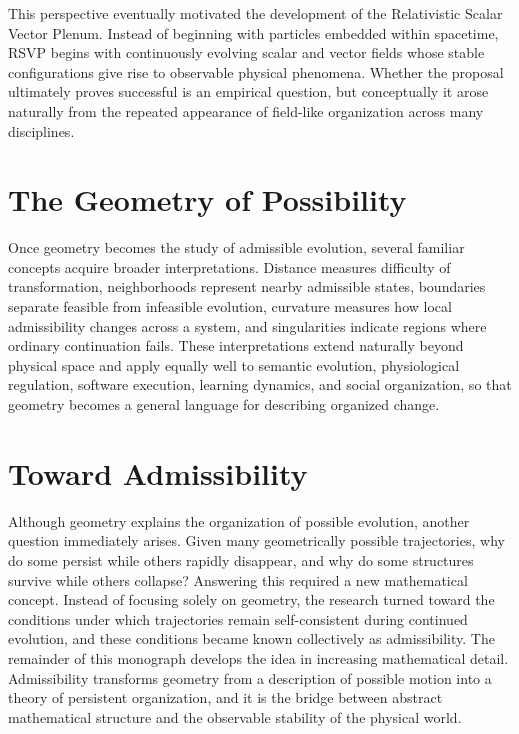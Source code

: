 \documentclass[11pt,oneside]{book}
\numberwithin{equation}{chapter}
\theoremstyle{definition}
\theoremstyle{plain}
\begin{document}
This perspective eventually motivated the development of the Relativistic Scalar Vector Plenum. Instead of beginning with particles embedded within spacetime, RSVP begins with continuously evolving scalar and vector fields whose stable configurations give rise to observable physical phenomena. Whether the proposal ultimately proves successful is an empirical question, but conceptually it arose naturally from the repeated appearance of field-like organization across many disciplines.

\section{The Geometry of Possibility}

Once geometry becomes the study of admissible evolution, several familiar concepts acquire broader interpretations. Distance measures difficulty of transformation, neighborhoods represent nearby admissible states, boundaries separate feasible from infeasible evolution, curvature measures how local admissibility changes across a system, and singularities indicate regions where ordinary continuation fails. These interpretations extend naturally beyond physical space and apply equally well to semantic evolution, physiological regulation, software execution, learning dynamics, and social organization, so that geometry becomes a general language for describing organized change.

\section{Toward Admissibility}

Although geometry explains the organization of possible evolution, another question immediately arises. Given many geometrically possible trajectories, why do some persist while others rapidly disappear, and why do some structures survive while others collapse? Answering this required a new mathematical concept. Instead of focusing solely on geometry, the research turned toward the conditions under which trajectories remain self-consistent during continued evolution, and these conditions became known collectively as admissibility. The remainder of this monograph develops the idea in increasing mathematical detail. Admissibility transforms geometry from a description of possible motion into a theory of persistent organization, and it is the bridge between abstract mathematical structure and the observable stability of the physical world.
\end{document}
